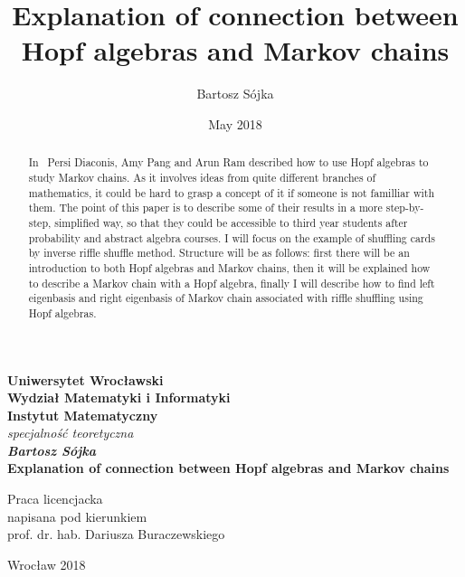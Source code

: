 \documentclass[a4paper, 12pt]{article}
\title{Explanation of connection between Hopf algebras and Markov chains}
\author{Bartosz Sójka}
\date{May 2018}
\begin{document}
\thispagestyle{empty}
\begin{center}
\textbf{\large Uniwersytet Wrocławski\\
Wydział Matematyki i Informatyki\\
Instytut Matematyczny}\\
\textit{\large specjalność teoretyczna}\\
\vspace{4cm}
\textbf{\textit{\large Bartosz Sójka}\\
\vspace{0.5cm}
{\Large Explanation of connection between Hopf algebras and Markov chains}}\\
\end{center}
\vspace{3cm}
{\large \hspace*{6.5cm}Praca licencjacka\\
\hspace*{6.5cm}napisana pod kierunkiem\\
\hspace*{6.5cm}prof. dr. hab. Dariusza Buraczewskiego }\\
\vfill
\begin{center}
{\large Wrocław 2018}\\
\end{center}
\newpage
\null
\thispagestyle{empty}
\newpage
\tableofcontents

\begin{abstract}

In~\cite{Diaconis2014} Persi Diaconis, Amy Pang and Arun Ram described how to use Hopf algebras to
study Markov chains. As it involves ideas from quite different branches of mathematics, it could be hard to
grasp a concept of it if someone is not familliar with them.
The point of this paper is to describe some of their results in a more step-by-step, simplified way,
so that they could be accessible to third year students after probability
and abstract algebra courses. I will focus on the example of shuffling cards by inverse riffle shuffle
method. Structure will be as follows: first there will be an introduction to both Hopf algebras and Markov
chains, then it will be explained how to describe a Markov chain with a Hopf algebra, finally I will
describe how to find left eigenbasis and right eigenbasis of Markov chain associated with riffle shuffling
using Hopf algebras.
\end{abstract}
\end{document}
